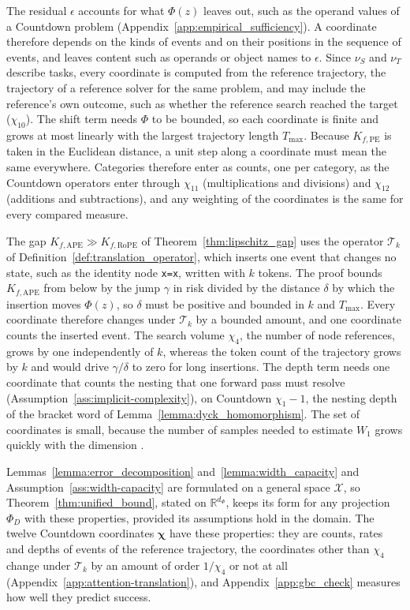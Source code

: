 The residual $\epsilon$ accounts for what $\Phi(z)$ leaves out, such as the operand values of a Countdown problem (Appendix~\ref{app:empirical_sufficiency}). A coordinate therefore depends on the kinds of events and on their positions in the sequence of events, and leaves content such as operands or object names to $\epsilon$. Since $\nu_S$ and $\nu_T$ describe tasks, every coordinate is computed from the reference trajectory, the trajectory of a reference solver for the same problem, and may include the reference's own outcome, such as whether the reference search reached the target ($\chi_{10}$). The shift term needs $\Phi$ to be bounded, so each coordinate is finite and grows at most linearly with the largest trajectory length $T_{\max}$. Because $K_{f,\mathrm{PE}}$ is taken in the Euclidean distance, a unit step along a coordinate must mean the same everywhere. Categories therefore enter as counts, one per category, as the Countdown operators enter through $\chi_{11}$ (multiplications and divisions) and $\chi_{12}$ (additions and subtractions), and any weighting of the coordinates is the same for every compared measure.

The gap $K_{f,\mathrm{APE}}\gg K_{f,\mathrm{RoPE}}$ of Theorem~\ref{thm:lipschitz_gap} uses the operator $\mathcal T_k$ of Definition~\ref{def:translation_operator}, which inserts one event that changes no state, such as the identity node \texttt{x=x}, written with $k$ tokens. The proof bounds $K_{f,\mathrm{APE}}$ from below by the jump $\gamma$ in risk divided by the distance $\delta$ by which the insertion moves $\Phi(z)$, so $\delta$ must be positive and bounded in $k$ and $T_{\max}$. Every coordinate therefore changes under $\mathcal T_k$ by a bounded amount, and one coordinate counts the inserted event. The search volume $\chi_4$, the number of node references, grows by one independently of $k$, whereas the token count of the trajectory grows by $k$ and would drive $\gamma/\delta$ to zero for long insertions. The depth term needs one coordinate that counts the nesting that one forward pass must resolve (Assumption~\ref{ass:implicit-complexity}), on Countdown $\chi_1-1$, the nesting depth of the bracket word of Lemma~\ref{lemma:dyck_homomorphism}. The set of coordinates is small, because the number of samples needed to estimate $W_1$ grows quickly with the dimension \citep{weed2019sharp}.

Lemmas~\ref{lemma:error_decomposition} and~\ref{lemma:width_capacity} and Assumption~\ref{ass:width-capacity} are formulated on a general space $\mathcal X$, so Theorem~\ref{thm:unified_bound}, stated on $\mathbb R^{d_\Phi}$, keeps its form for any projection $\Phi_D$ with these properties, provided its assumptions hold in the domain. The twelve Countdown coordinates $\boldsymbol\chi$ have these properties: they are counts, rates and depths of events of the reference trajectory, the coordinates other than $\chi_4$ change under $\mathcal T_k$ by an amount of order $1/\chi_4$ or not at all (Appendix~\ref{app:attention-translation}), and Appendix~\ref{app:gbc_check} measures how well they predict success.

